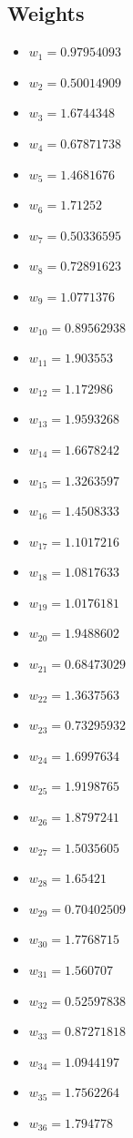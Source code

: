 \documentclass[11pt]{article}
\begin{document}
\subsection*{Weights}
\begin{itemize}
\item $w_{1} = 0.97954093$
\item $w_{2} = 0.50014909$
\item $w_{3} = 1.6744348$
\item $w_{4} = 0.67871738$
\item $w_{5} = 1.4681676$
\item $w_{6} = 1.71252$
\item $w_{7} = 0.50336595$
\item $w_{8} = 0.72891623$
\item $w_{9} = 1.0771376$
\item $w_{10} = 0.89562938$
\item $w_{11} = 1.903553$
\item $w_{12} = 1.172986$
\item $w_{13} = 1.9593268$
\item $w_{14} = 1.6678242$
\item $w_{15} = 1.3263597$
\item $w_{16} = 1.4508333$
\item $w_{17} = 1.1017216$
\item $w_{18} = 1.0817633$
\item $w_{19} = 1.0176181$
\item $w_{20} = 1.9488602$
\item $w_{21} = 0.68473029$
\item $w_{22} = 1.3637563$
\item $w_{23} = 0.73295932$
\item $w_{24} = 1.6997634$
\item $w_{25} = 1.9198765$
\item $w_{26} = 1.8797241$
\item $w_{27} = 1.5035605$
\item $w_{28} = 1.65421$
\item $w_{29} = 0.70402509$
\item $w_{30} = 1.7768715$
\item $w_{31} = 1.560707$
\item $w_{32} = 0.52597838$
\item $w_{33} = 0.87271818$
\item $w_{34} = 1.0944197$
\item $w_{35} = 1.7562264$
\item $w_{36} = 1.794778$

\end{itemize}
\end{document}
